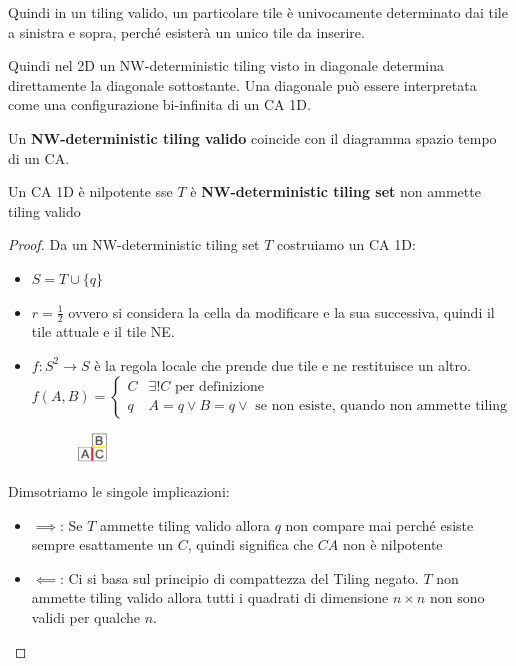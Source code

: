 Quindi in un tiling valido, un particolare tile è univocamente determinato 
dai tile a sinistra e sopra, perché esisterà un unico tile da inserire.

Quindi nel 2D un NW-deterministic tiling visto in diagonale determina direttamente 
la diagonale sottostante. Una diagonale può essere interpretata come una configurazione 
bi-infinita di un CA 1D. 

\begin{nota}
    Un \textbf{NW-deterministic tiling valido} coincide con il diagramma spazio
    tempo di un CA. 
\end{nota}

\begin{teorema} 
    Un CA 1D è nilpotente sse  $T$ è \textbf{NW-deterministic tiling set} non ammette tiling
    valido
    \begin{proof}
        Da un NW-deterministic tiling set $T$ costruiamo un CA 1D:
        \begin{itemize}
            \item $S= T\cup \{q\}$
            \item $r=\frac{1}{2}$ ovvero si considera la cella da modificare e 
            la sua successiva, quindi il tile attuale e il tile NE.
            \item $f:S^2\rightarrow S$ è la regola locale che prende due tile 
            e ne restituisce un altro.
            $$f(A,B) = \begin{cases}
                C & \exists ! C \text{ per definizione}\\
                q &  A=q\lor B=q\lor\text{ se non esiste, quando non ammette tiling}
            \end{cases}$$
            \begin{figure}
                \centering
                \includegraphics[width=0.1\textwidth]{img/sistemi_complessi/tileset.png}
            \end{figure}
        \end{itemize}
        Dimsotriamo le singole implicazioni:
        \begin{itemize}
            \item $\implies$: Se $T$ ammette tiling valido allora $q$ non compare 
            mai perché esiste sempre esattamente un $C$, quindi significa che $CA$
            non è nilpotente
            \item $\impliedby$: Ci si basa sul principio di compattezza del Tiling 
            negato. $T$ non ammette tiling valido allora tutti i quadrati di dimensione 
            $n\times n$ non sono validi per qualche $n$.
            

\end{itemize}
\end{proof}
\end{teorema}
